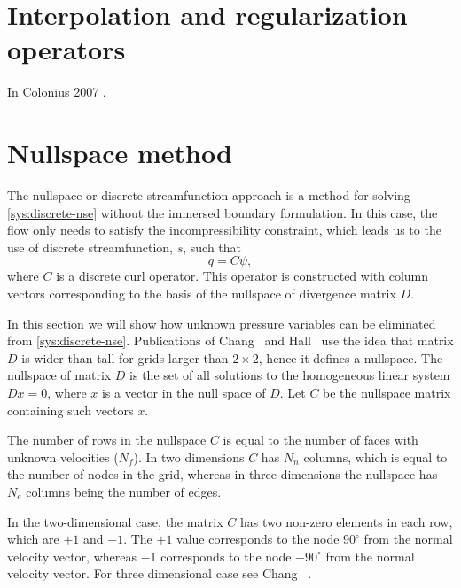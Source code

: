 \documentclass{article}
\numberwithin{equation}{section}
\begin{document}
\section{Interpolation and regularization operators}

In Colonius 2007 \cite{Colonius:2007}.


\section{Nullspace method}\label{sec:nullspace}


The nullspace or discrete streamfunction approach \cite{Chang:2002,Hall:1980} is a method for solving \cref{sys:discrete-nse} without the immersed boundary formulation. In this case, the flow only needs to satisfy the incompressibility constraint, which leads us to the use of discrete streamfunction, $s$, such that
\begin{equation}
	q = C\psi,
\end{equation}
where $C$ is a discrete curl operator. This operator is constructed with column vectors corresponding to the basis of the nullspace of divergence matrix $D$.

In this section we will show how unknown pressure variables can be eliminated from \cref{sys:discrete-nse}. Publications of Chang~\cite{Chang:2002} and Hall~\cite{Hall:1980} use the idea that matrix $D$ is wider than tall for grids larger than $2\times 2$, hence it defines a nullspace. The nullspace of matrix $D$ is the set of all solutions to the homogeneous linear system $Dx = 0$, where $x$ is a vector in the null space of $D$. Let $C$ be the nullspace matrix containing such vectors $x$. 

The number of rows in the nullspace $C$ is equal to the number of faces with unknown velocities ($N_f$). In two dimensions $C$ has $N_n$ columns, which is equal to the number of nodes in the grid, whereas in three dimensions the nullspace has $N_e$ columns being the number of edges. 

In the two-dimensional case, the matrix $C$ has two non-zero elements in each row, which are $+1$ and $-1$. The $+1$ value corresponds to the node $90^\circ$ from the normal velocity vector, whereas $-1$ corresponds to the node $-90^\circ$ from the normal velocity vector.  For three dimensional case see Chang ~\cite{Chang:2002}.
\end{document}

